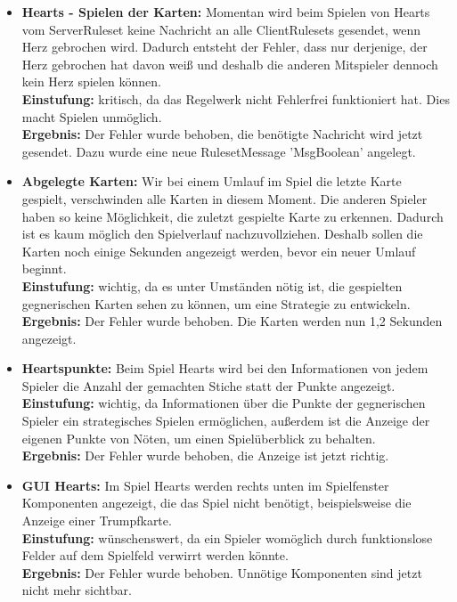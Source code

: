 \documentclass[a4paper]{article}
\begin{document}
	\begin{itemize}
	\item \textbf{Hearts - Spielen der Karten:} Momentan wird beim Spielen von Hearts vom ServerRuleset keine Nachricht an 		alle ClientRulesets gesendet, wenn Herz gebrochen wird. Dadurch entsteht der Fehler, dass nur derjenige, der Herz 			gebrochen hat davon weiß und deshalb die anderen Mitspieler dennoch kein Herz spielen können. \\
	\textbf{Einstufung:} kritisch, da das Regelwerk nicht Fehlerfrei funktioniert hat. Dies macht Spielen unmöglich.\\
	\textbf{Ergebnis:} Der Fehler wurde behoben, die benötigte Nachricht wird jetzt gesendet. Dazu wurde eine neue RulesetMessage 'MsgBoolean' angelegt.\\
	
	\item \textbf{Abgelegte Karten:} Wir bei einem Umlauf im Spiel die letzte Karte gespielt, verschwinden alle Karten in 			diesem Moment. Die anderen Spieler haben so keine Möglichkeit, die zuletzt gespielte Karte zu erkennen. Dadurch ist es 			kaum möglich den Spielverlauf nachzuvollziehen. Deshalb sollen die Karten noch einige Sekunden angezeigt werden, bevor 		ein neuer Umlauf beginnt. \\
	\textbf{Einstufung:} wichtig, da es unter Umständen nötig ist, die gespielten gegnerischen Karten sehen zu können, um eine Strategie zu entwickeln. 
	\textbf{Ergebnis:} Der Fehler wurde behoben. Die Karten werden nun 1,2 Sekunden angezeigt.\\
	
	\item \textbf{Heartspunkte:} Beim Spiel Hearts wird bei den Informationen von jedem Spieler die Anzahl der gemachten 			Stiche statt der Punkte angezeigt. \\
	\textbf{Einstufung:} wichtig, da Informationen über die Punkte der gegnerischen Spieler ein strategisches Spielen ermöglichen, außerdem ist die Anzeige der eigenen Punkte von Nöten, um einen Spielüberblick zu behalten.\\
	\textbf{Ergebnis:} Der Fehler wurde behoben, die Anzeige ist jetzt richtig.

	\item \textbf{GUI Hearts:} Im Spiel Hearts werden rechts unten im Spielfenster Komponenten angezeigt, die das Spiel 			nicht benötigt, beispielsweise die Anzeige einer Trumpfkarte. \\
	\textbf{Einstufung:} wünschenswert, da ein Spieler womöglich durch funktionslose Felder auf dem Spielfeld verwirrt werden könnte.\\
	\textbf{Ergebnis:} Der Fehler wurde behoben. Unnötige Komponenten sind jetzt nicht mehr sichtbar.\\
	

\end{itemize}
\end{document}
